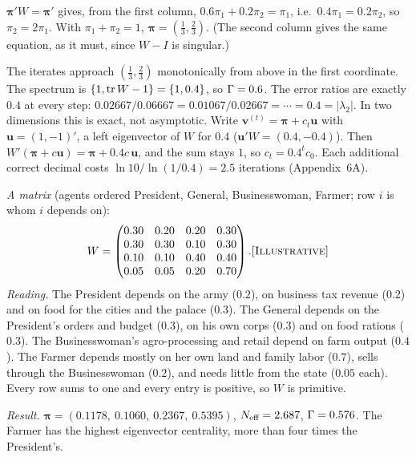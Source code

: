 \documentclass[../solutions_manual.tex]{subfiles}
\begin{document}
 $\boldsymbol{\pi}'W = \boldsymbol{\pi}'$ gives, from the first column, $0.6\pi_1 + 0.2\pi_2 = \pi_1$, i.e.\ $0.4\pi_1 = 0.2\pi_2$, so $\pi_2 = 2\pi_1$. With $\pi_1 + \pi_2 = 1$, $\boldsymbol{\pi} = (\frac13, \frac23)$. (The second column gives the same equation, as it must, since $W - I$ is singular.)

 The iterates approach $(\frac13, \frac23)$ monotonically from above in the first coordinate. The spectrum is $\{1, \operatorname{tr} W - 1\} = \{1, 0.4\}$, so $\Gamma = 0.6$. The error ratios are exactly $0.4$ at every step: $0.02667/0.06667 = 0.01067/0.02667 = \cdots = 0.4 = |\lambda_2|$. In two dimensions this is exact, not asymptotic. Write $\mathbf{v}^{(t)} = \boldsymbol{\pi} + c_t\mathbf{u}$ with $\mathbf{u} = (1,-1)'$, a left eigenvector of $W$ for $0.4$ ($\mathbf{u}'W = (0.4, -0.4)$). Then $W'(\boldsymbol{\pi} + c\mathbf{u}) = \boldsymbol{\pi} + 0.4c\,\mathbf{u}$, and the sum stays $1$, so $c_{t} = 0.4^t c_0$. Each additional correct decimal costs $\ln 10/\ln(1/0.4) = 2.5$ iterations (Appendix~6A).


\emph{A matrix} (agents ordered President, General, Businesswoman, Farmer; row $i$ is whom $i$ depends on):
\[
W = \begin{pmatrix}
0.30 & 0.20 & 0.20 & 0.30 \\
0.30 & 0.30 & 0.10 & 0.30 \\
0.10 & 0.10 & 0.40 & 0.40 \\
0.05 & 0.05 & 0.20 & 0.70
\end{pmatrix}. \textup{\textsc{[Illustrative]}}
\]
\emph{Reading.} The President depends on the army ($0.2$), on business tax revenue ($0.2$) and on food for the cities and the palace ($0.3$). The General depends on the President's orders and budget ($0.3$), on his own corps ($0.3$) and on food rations ($0.3$). The Businesswoman's agro-processing and retail depend on farm output ($0.4$). The Farmer depends mostly on her own land and family labor ($0.7$), sells through the Businesswoman ($0.2$), and needs little from the state ($0.05$ each). Every row sums to one and every entry is positive, so $W$ is primitive.

\emph{Result.} $\boldsymbol{\pi} = (0.1178,\ 0.1060,\ 0.2367,\ 0.5395)$, $N_{\text{eff}} = 2.687$, $\Gamma = 0.576$. The Farmer has the highest eigenvector centrality, more than four times the President's.
\end{document}
